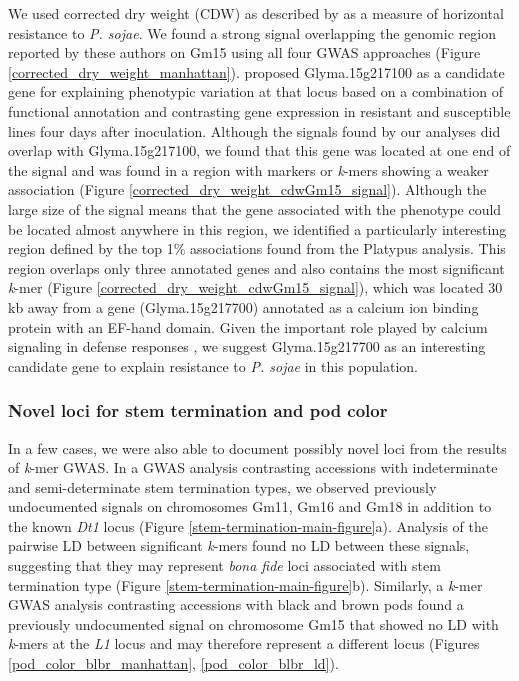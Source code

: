 We used corrected dry weight (CDW) as described by \cite{deronne2022} as a
measure of horizontal resistance to \emph{P. sojae}. We found a strong signal
overlapping the genomic region reported by these authors on Gm15 using all four GWAS
approaches (Figure \ref{corrected_dry_weight_manhattan}). \cite{deronne2022}
proposed Glyma.15g217100 as a candidate gene for explaining phenotypic
variation at that locus based on a combination of functional annotation and
contrasting gene expression in resistant and susceptible lines four days after
inoculation. Although the signals found by our analyses did overlap with
Glyma.15g217100, we found that this gene was located at one end of the signal
and was found in a region with markers or \emph{k}-mers showing a weaker
association (Figure \ref{corrected_dry_weight_cdwGm15_signal}).  Although the
large size of the signal means that the gene associated with the phenotype could
be located almost anywhere in this region, we identified a particularly
interesting region defined by the top 1\% associations found from the Platypus
analysis. This region overlaps only three annotated genes and also contains the
most significant \emph{k}-mer (Figure
\ref{corrected_dry_weight_cdwGm15_signal}), which was located 30 kb away from a
gene (Glyma.15g217700) annotated as a calcium ion binding protein with an
EF-hand domain. Given the important role played by calcium signaling in defense
responses \citep{zhang2014}, we suggest Glyma.15g217700 as an interesting
candidate gene to explain resistance to \emph{P. sojae} in this population.

\subsubsection{Novel loci for stem termination and pod color}
\label{sv-gwas-main-results-novel-loci}

In a few cases, we were also able to document possibly novel loci from the
results of \textit{k}-mer GWAS. In a GWAS analysis contrasting accessions
with indeterminate and semi-determinate stem termination types, we observed
previously undocumented signals on chromosomes Gm11, Gm16 and Gm18 in
addition to the known \textit{Dt1} locus (Figure \ref{stem-termination-main-figure}a).
Analysis of the pairwise LD between significant \textit{k}-mers found no
LD between these signals, suggesting that they may represent \textit{bona fide}
loci associated with stem termination type
(Figure \ref{stem-termination-main-figure}b). Similarly, a \textit{k}-mer GWAS
analysis contrasting accessions with black and brown pods found a previously
undocumented signal on chromosome Gm15 that showed no LD with \textit{k}-mers
at the \textit{L1} locus and may therefore represent a different locus (Figures
\ref{pod_color_blbr_manhattan}, \ref{pod_color_blbr_ld}).

